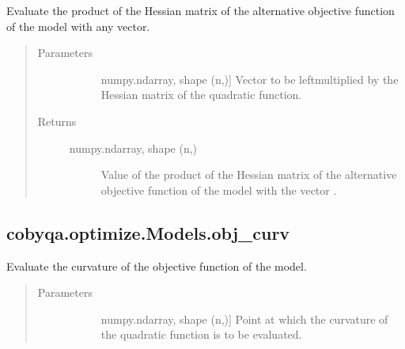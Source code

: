 \documentclass[letterpaper,10pt,english]{sphinxmanual}
\begin{document}
\begin{fulllineitems}
\begin{fulllineitems}
\label{\detokenize{refs/generated/cobyqa.optimize.Models.obj_alt_hessp:cobyqa.optimize.Models.obj_alt_hessp}}
\sphinxAtStartPar
Evaluate the product of the Hessian matrix of the alternative objective
function of the model with any vector.
\begin{quote}\begin{description}
\item[{Parameters}] \leavevmode\begin{description}
\item[{}] \leavevmode{[}numpy.ndarray, shape (n,){]}
\sphinxAtStartPar
Vector to be left\sphinxhyphen{}multiplied by the Hessian matrix of the quadratic
function.

\end{description}

\item[{Returns}] \leavevmode\begin{description}
\item[{numpy.ndarray, shape (n,)}] \leavevmode
\sphinxAtStartPar
Value of the product of the Hessian matrix of the alternative
objective function of the model with the vector .

\end{description}

\end{description}\end{quote}

\end{fulllineitems}



\subsection{cobyqa.optimize.Models.obj\_curv}
\label{\detokenize{refs/generated/cobyqa.optimize.Models.obj_curv:cobyqa-optimize-models-obj-curv}}\label{\detokenize{refs/generated/cobyqa.optimize.Models.obj_curv::doc}}

\begin{fulllineitems}
\label{\detokenize{refs/generated/cobyqa.optimize.Models.obj_curv:cobyqa.optimize.Models.obj_curv}}
\sphinxAtStartPar
Evaluate the curvature of the objective function of the model.
\begin{quote}\begin{description}
\item[{Parameters}] \leavevmode\begin{description}
\item[{}] \leavevmode{[}numpy.ndarray, shape (n,){]}
\sphinxAtStartPar
Point at which the curvature of the quadratic function is to be
evaluated.


\end{description}
\end{description}
\end{quote}
\end{fulllineitems}
\end{fulllineitems}
\end{document}
